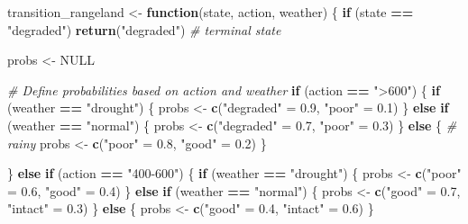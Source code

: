 \documentclass[
]{article}
\newenvironment{Shaded}{\begin{snugshade}}{\end{snugshade}}
\newcommand{\CommentTok}[1]{\textcolor[rgb]{0.56,0.35,0.01}{\textit{#1}}}
\newcommand{\ConstantTok}[1]{\textcolor[rgb]{0.56,0.35,0.01}{#1}}
\newcommand{\ControlFlowTok}[1]{\textcolor[rgb]{0.13,0.29,0.53}{\textbf{#1}}}
\newcommand{\FloatTok}[1]{\textcolor[rgb]{0.00,0.00,0.81}{#1}}
\newcommand{\FunctionTok}[1]{\textcolor[rgb]{0.13,0.29,0.53}{\textbf{#1}}}
\newcommand{\NormalTok}[1]{#1}
\newcommand{\OtherTok}[1]{\textcolor[rgb]{0.56,0.35,0.01}{#1}}
\newcommand{\SpecialCharTok}[1]{\textcolor[rgb]{0.81,0.36,0.00}{\textbf{#1}}}
\newcommand{\StringTok}[1]{\textcolor[rgb]{0.31,0.60,0.02}{#1}}
\begin{document}
\begin{Shaded}
\begin{Highlighting}[]
\NormalTok{transition\_rangeland }\OtherTok{\textless{}{-}} \ControlFlowTok{function}\NormalTok{(state, action, weather) \{}
  \ControlFlowTok{if}\NormalTok{ (state }\SpecialCharTok{==} \StringTok{"degraded"}\NormalTok{) }\FunctionTok{return}\NormalTok{(}\StringTok{"degraded"}\NormalTok{)  }\CommentTok{\# terminal state}
  
\NormalTok{  probs }\OtherTok{\textless{}{-}} \ConstantTok{NULL}
  
  \CommentTok{\# Define probabilities based on action and weather}
  \ControlFlowTok{if}\NormalTok{ (action }\SpecialCharTok{==} \StringTok{"\textgreater{}600"}\NormalTok{) \{}
    \ControlFlowTok{if}\NormalTok{ (weather }\SpecialCharTok{==} \StringTok{"drought"}\NormalTok{) \{}
\NormalTok{      probs }\OtherTok{\textless{}{-}} \FunctionTok{c}\NormalTok{(}\StringTok{"degraded"} \OtherTok{=} \FloatTok{0.9}\NormalTok{, }\StringTok{"poor"} \OtherTok{=} \FloatTok{0.1}\NormalTok{)}
\NormalTok{    \} }\ControlFlowTok{else} \ControlFlowTok{if}\NormalTok{ (weather }\SpecialCharTok{==} \StringTok{"normal"}\NormalTok{) \{}
\NormalTok{      probs }\OtherTok{\textless{}{-}} \FunctionTok{c}\NormalTok{(}\StringTok{"degraded"} \OtherTok{=} \FloatTok{0.7}\NormalTok{, }\StringTok{"poor"} \OtherTok{=} \FloatTok{0.3}\NormalTok{)}
\NormalTok{    \} }\ControlFlowTok{else}\NormalTok{ \{  }\CommentTok{\# rainy}
\NormalTok{      probs }\OtherTok{\textless{}{-}} \FunctionTok{c}\NormalTok{(}\StringTok{"poor"} \OtherTok{=} \FloatTok{0.8}\NormalTok{, }\StringTok{"good"} \OtherTok{=} \FloatTok{0.2}\NormalTok{)}
\NormalTok{    \}}
    
\NormalTok{  \} }\ControlFlowTok{else} \ControlFlowTok{if}\NormalTok{ (action }\SpecialCharTok{==} \StringTok{"400{-}600"}\NormalTok{) \{}
    \ControlFlowTok{if}\NormalTok{ (weather }\SpecialCharTok{==} \StringTok{"drought"}\NormalTok{) \{}
\NormalTok{      probs }\OtherTok{\textless{}{-}} \FunctionTok{c}\NormalTok{(}\StringTok{"poor"} \OtherTok{=} \FloatTok{0.6}\NormalTok{, }\StringTok{"good"} \OtherTok{=} \FloatTok{0.4}\NormalTok{)}
\NormalTok{    \} }\ControlFlowTok{else} \ControlFlowTok{if}\NormalTok{ (weather }\SpecialCharTok{==} \StringTok{"normal"}\NormalTok{) \{}
\NormalTok{      probs }\OtherTok{\textless{}{-}} \FunctionTok{c}\NormalTok{(}\StringTok{"good"} \OtherTok{=} \FloatTok{0.7}\NormalTok{, }\StringTok{"intact"} \OtherTok{=} \FloatTok{0.3}\NormalTok{)}
\NormalTok{    \} }\ControlFlowTok{else}\NormalTok{ \{}
\NormalTok{      probs }\OtherTok{\textless{}{-}} \FunctionTok{c}\NormalTok{(}\StringTok{"good"} \OtherTok{=} \FloatTok{0.4}\NormalTok{, }\StringTok{"intact"} \OtherTok{=} \FloatTok{0.6}\NormalTok{)}
\NormalTok{    \}}
    

\end{Highlighting}
\end{Shaded}
\end{document}
